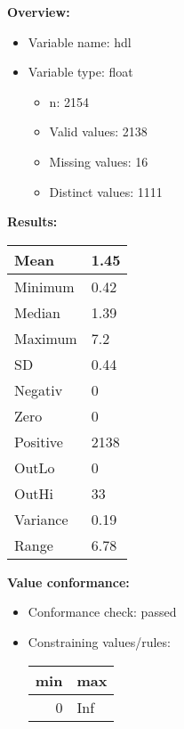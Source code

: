 \documentclass[
]{article}
\providecommand{\tightlist}{%
  \setlength{\itemsep}{0pt}\setlength{\parskip}{0pt}}
\begin{document}
\textbf{Overview:}

\begin{itemize}
\tightlist
\item
  Variable name: hdl
\item
  Variable type: float

  \begin{itemize}
  \tightlist
  \item
    n: 2154
  \item
    Valid values: 2138
  \item
    Missing values: 16
  \item
    Distinct values: 1111
  \end{itemize}
\end{itemize}

\textbf{Results:}\\

\begin{table}[H]
\centering
\begin{tabular}{l|l}
\hline
Mean & 1.45\\
\hline
Minimum & 0.42\\
\hline
Median & 1.39\\
\hline
Maximum & 7.2\\
\hline
SD & 0.44\\
\hline
Negativ & 0\\
\hline
Zero & 0\\
\hline
Positive & 2138\\
\hline
OutLo & 0\\
\hline
OutHi & 33\\
\hline
Variance & 0.19\\
\hline
Range & 6.78\\
\hline
\end{tabular}
\end{table}

\textbf{Value conformance:}

\begin{itemize}
\tightlist
\item
  Conformance check: passed
\item
  Constraining values/rules:

  \begin{table}[H]
  \centering
  \begin{tabular}{r|l}
  \hline
  \textbf{min} & \textbf{max}\\
  \hline
  0 & Inf\\
  \hline
  \end{tabular}
  \end{table}
\end{itemize}
\end{document}
